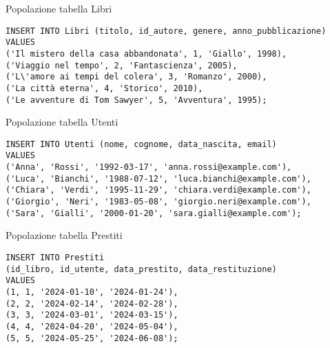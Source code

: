 %
\begin{frame}[fragile]{Popolazione tabella Libri}
\begin{lstlisting}
INSERT INTO Libri (titolo, id_autore, genere, anno_pubblicazione)
VALUES 
('Il mistero della casa abbandonata', 1, 'Giallo', 1998),
('Viaggio nel tempo', 2, 'Fantascienza', 2005),
('L\'amore ai tempi del colera', 3, 'Romanzo', 2000),
('La città eterna', 4, 'Storico', 2010),
('Le avventure di Tom Sawyer', 5, 'Avventura', 1995);    
\end{lstlisting}
\end{frame}
%
\begin{frame}[fragile]{Popolazione tabella Utenti}
\begin{lstlisting}
INSERT INTO Utenti (nome, cognome, data_nascita, email)
VALUES 
('Anna', 'Rossi', '1992-03-17', 'anna.rossi@example.com'),
('Luca', 'Bianchi', '1988-07-12', 'luca.bianchi@example.com'),
('Chiara', 'Verdi', '1995-11-29', 'chiara.verdi@example.com'),
('Giorgio', 'Neri', '1983-05-08', 'giorgio.neri@example.com'),
('Sara', 'Gialli', '2000-01-20', 'sara.gialli@example.com');
\end{lstlisting}
\end{frame}
%
\begin{frame}[fragile]{Popolazione tabella Prestiti}    
\begin{lstlisting}
INSERT INTO Prestiti
(id_libro, id_utente, data_prestito, data_restituzione)
VALUES 
(1, 1, '2024-01-10', '2024-01-24'),
(2, 2, '2024-02-14', '2024-02-28'),
(3, 3, '2024-03-01', '2024-03-15'),
(4, 4, '2024-04-20', '2024-05-04'),
(5, 5, '2024-05-25', '2024-06-08');    
\end{lstlisting}
\end{frame}